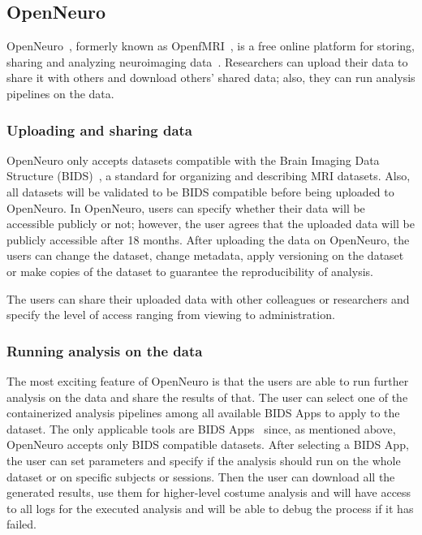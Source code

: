 \subsection{OpenNeuro}
OpenNeuro~\cite{markiewicz2021openneuro,gorgolewski2017openneuro}, formerly known as OpenfMRI~\cite{poldrack2017openfmri}, is a free online platform for storing, sharing and analyzing neuroimaging data~\cite{gorgolewski2017openneuro}. Researchers can upload their data to share it with others and download others' shared data; also, they can run analysis pipelines on the data. 

\subsubsection{Uploading and sharing data}
 OpenNeuro only accepts datasets compatible with the Brain Imaging Data Structure (BIDS)~\cite{gorgolewski2016brain}, a standard for organizing and describing MRI datasets. Also, all datasets will be validated to be BIDS compatible before being uploaded to OpenNeuro.
 In OpenNeuro, users can specify whether their data will be accessible publicly or not; however, the user agrees that the uploaded data will be publicly accessible after 18 months. After uploading the data on OpenNeuro, the users can change the dataset, change metadata, apply versioning on the dataset or make copies of the dataset to guarantee the reproducibility of analysis. 
 
 The users can share their uploaded data with other colleagues or researchers and specify the level of access ranging from viewing to administration. 

\subsubsection{Running analysis on the data }
The most exciting feature of OpenNeuro is that the users are able to run further analysis on the data and share the results of that. The user can select one of the containerized analysis pipelines among all available BIDS Apps to apply to the dataset. The only applicable tools are BIDS Apps~\cite{gorgolewski2017bids} since, as mentioned above, OpenNeuro accepts only BIDS compatible datasets. After selecting a BIDS App, the user can set parameters and specify if the analysis should run on the whole dataset or on specific subjects or sessions. Then the user can download all the generated results, use them for higher-level costume analysis and will have access to all logs for the executed analysis and will be able to debug the process if it has failed.


